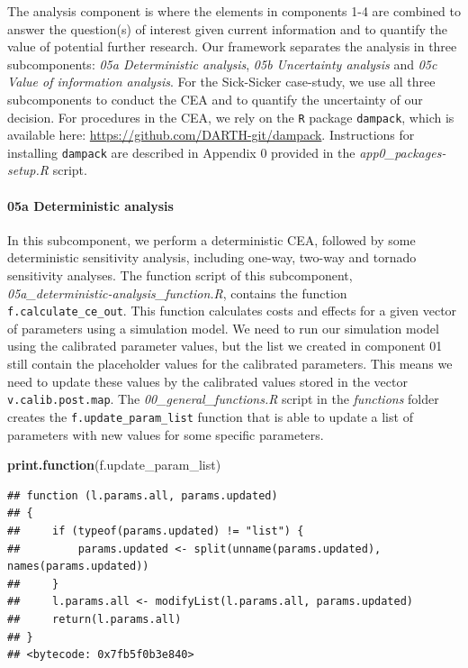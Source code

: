 \documentclass[]{article}
\newenvironment{Shaded}{\begin{snugshade}}{\end{snugshade}}
\newcommand{\KeywordTok}[1]{\textcolor[rgb]{0.13,0.29,0.53}{\textbf{#1}}}
\newcommand{\NormalTok}[1]{#1}
\let\oldparagraph\paragraph
\renewcommand{\paragraph}[1]{\oldparagraph{#1}\mbox{}}
\begin{document}
The analysis component is where the elements in components 1-4 are
combined to answer the question(s) of interest given current information
and to quantify the value of potential further research. Our framework
separates the analysis in three subcomponents: \emph{05a Deterministic
analysis}, \emph{05b Uncertainty analysis} and \emph{05c Value of
information analysis}. For the Sick-Sicker case-study, we use all three
subcomponents to conduct the CEA and to quantify the uncertainty of our
decision. For procedures in the CEA, we rely on the \texttt{R} package
\texttt{dampack}, which is available here:
\url{https://github.com/DARTH-git/dampack}. Instructions for installing
\texttt{dampack} are described in Appendix 0 provided in the
\emph{app0\_packages-setup.R} script.

\paragraph{05a Deterministic analysis}\label{a-deterministic-analysis}

In this subcomponent, we perform a deterministic CEA, followed by some
deterministic sensitivity analysis, including one-way, two-way and
tornado sensitivity analyses. The function script of this subcomponent,
\emph{05a\_deterministic-analysis\_function.R}, contains the function
\texttt{f.calculate\_ce\_out}. This function calculates costs and
effects for a given vector of parameters using a simulation model. We
need to run our simulation model using the calibrated parameter values,
but the list we created in component 01 still contain the placeholder
values for the calibrated parameters. This means we need to update these
values by the calibrated values stored in the vector
\texttt{v.calib.post.map}. The \emph{00\_general\_functions.R} script in
the \emph{functions} folder creates the \texttt{f.update\_param\_list}
function that is able to update a list of parameters with new values for
some specific parameters.

\begin{Shaded}
\begin{Highlighting}[]
\KeywordTok{print.function}\NormalTok{(f.update_param_list)}
\end{Highlighting}
\end{Shaded}

\begin{verbatim}
## function (l.params.all, params.updated) 
## {
##     if (typeof(params.updated) != "list") {
##         params.updated <- split(unname(params.updated), names(params.updated))
##     }
##     l.params.all <- modifyList(l.params.all, params.updated)
##     return(l.params.all)
## }
## <bytecode: 0x7fb5f0b3e840>
\end{verbatim}
\end{document}
